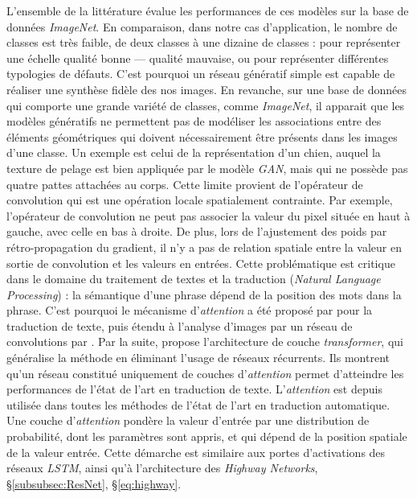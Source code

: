 L'ensemble de la littérature évalue les performances de ces modèles sur la base de données \textit{ImageNet}.
En comparaison, dans notre cas d'application, le nombre de classes est très faible, de deux classes à une dizaine de classes : pour représenter une échelle qualité bonne — qualité mauvaise, ou pour représenter différentes typologies de défauts.
C'est pourquoi un réseau génératif simple est capable de réaliser une synthèse fidèle des nos images.
En revanche, sur une base de données qui comporte une grande variété de classes, comme \textit{ImageNet}, il apparait que les modèles génératifs ne permettent pas de modéliser les associations entre des éléments géométriques qui doivent nécessairement être présents dans les images d'une classe.
Un exemple est celui de la représentation d'un chien, auquel la texture de pelage est bien appliquée par le modèle \textit{GAN}, mais qui ne possède pas quatre pattes attachées au corps.
Cette limite provient de l'opérateur de convolution qui est une opération locale spatialement contrainte.
Par exemple, l'opérateur de convolution ne peut pas associer la valeur du pixel située en haut à gauche, avec celle en bas à droite.
De plus, lors de l'ajustement des poids par rétro-propagation du gradient, il n'y a pas de relation spatiale entre la valeur en sortie de convolution et les valeurs en entrées.
Cette problématique est critique dans le domaine du traitement de textes et la traduction (\textit{Natural Language Processing}) : la sémantique d'une phrase dépend de la position des mots dans la phrase.
C'est pourquoi le mécanisme d'\textit{attention} a été proposé par \citeauthor{bahdanau_neural_2014} \cite{bahdanau_neural_2014} pour la traduction de texte, puis étendu à l'analyse d'images par un réseau de convolutions par \cite{xu_show_2015}.
Par la suite, \citeauthor{vaswani_attention_2017} \cite{vaswani_attention_2017} propose l'architecture de couche \textit{transformer}, qui généralise la méthode en éliminant l'usage de réseaux récurrents.
Ils montrent qu'un réseau constitué uniquement de couches d'\textit{attention} permet d'atteindre les performances de l'état de l'art en traduction de texte.
L'\textit{attention} est depuis utilisée dans toutes les méthodes de l'état de l'art en traduction automatique.
Une couche d'\textit{attention} pondère la valeur d'entrée par une distribution de probabilité, dont les paramètres sont appris, et qui dépend de la position spatiale de la valeur entrée.
Cette démarche est similaire aux portes d'activations des réseaux \textit{LSTM}, ainsi qu'à l'architecture des \textit{Highway Networks}, §\ref{subsubsec:ResNet}, §\ref{eq:highway}.

